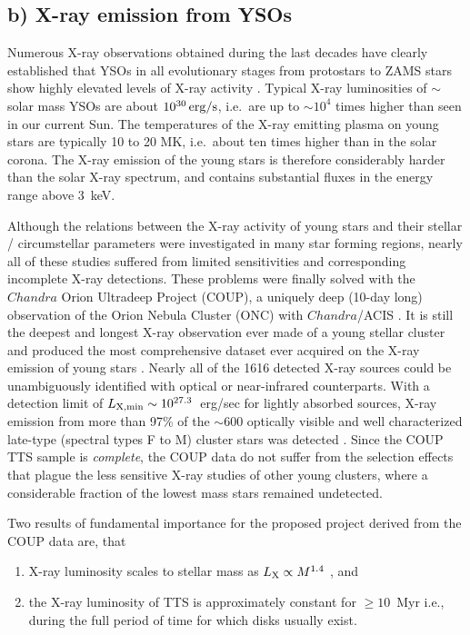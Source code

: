 \documentclass[10pt,fleqn,twoside,a4paper]{article}
\begin{document}
\subsection*{b) X-ray emission from YSOs}

Numerous X-ray observations obtained during the last decades have clearly
established that YSOs in all evolutionary stages from
protostars  to  ZAMS stars show highly elevated levels of X-ray  activity
\citep{FM99,PZH96,PZ02,Preibisch_coup_orig,Preibisch11,Preibisch14}.
Typical X-ray luminosities of $\sim$ solar mass YSOs are about $10^{30}\,\rm erg/s$,
i.e.~are up to $\sim 10^4$ times higher than seen in our current Sun.
The temperatures of the X-ray emitting  plasma on young stars
are typically 10 to 20 MK,  i.e.~about ten times higher than in the solar corona.
The X-ray emission of the young stars is therefore considerably harder than the solar
X-ray spectrum, and contains substantial fluxes in the
energy range above 3~keV.

Although the relations between the X-ray activity of young stars and their
stellar / circumstellar parameters were investigated in many star forming regions,
nearly all of these studies suffered from
limited sensitivities and corresponding incomplete X-ray detections.
These problems were finally solved with the
$Chandra$ Orion Ultradeep Project (COUP), a uniquely deep (10-day long)
observation of the Orion Nebula Cluster (ONC)
with $Chandra$/ACIS \citep[for details of the observation and
data analysis see][]{Getman05}.
It is still the deepest and longest X-ray
observation ever made of a young stellar cluster and
produced the most comprehensive dataset ever acquired on the X-ray
emission of young stars \citep{Preibisch_coup_orig}.
Nearly all of the 1616 detected X-ray sources could be
unambiguously identified with optical or near-infrared counterparts.
With a detection limit of
$L_{\rm X,min} \sim 10^{27.3}$~erg/sec for lightly absorbed
sources, X-ray emission from more than 97\% of the
$\sim 600$
optically visible and well characterized late-type
(spectral types F to M) cluster stars
was detected \citep{Preibisch_coup_orig}. 
Since the COUP TTS sample is {\em complete}, 
 the COUP data do not suffer from the
selection effects that plague the less sensitive X-ray studies of
other young clusters,
where a considerable fraction of the lowest mass stars remained undetected.

Two results of fundamental importance for the proposed project 
derived from the COUP data are, that
\begin{enumerate}

\item X-ray luminosity scales to stellar mass as $L_{\rm X} \propto M^{1.4}$ \citep{Preibisch_coup_orig},
and  

\item the X-ray luminosity of TTS is approximately constant for $\ge 10$~Myr \citep{PF05}
 i.e., during the full period of time for which disks usually exist.
\end{enumerate}
\end{document}
